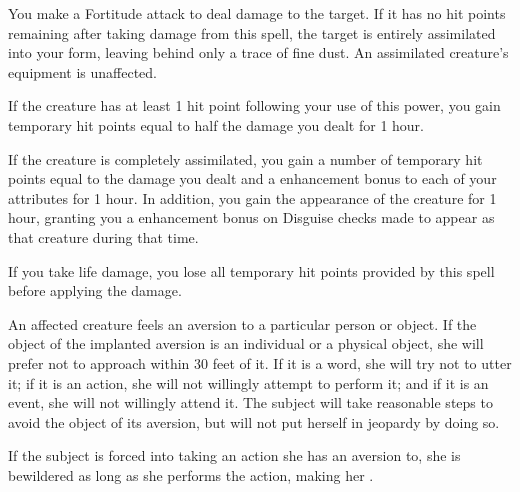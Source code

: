 \spellrng{\rngtouch}
You make a Fortitude attack to deal damage to the target. If it has no hit points remaining after taking damage from this spell, the target is entirely assimilated into your form, leaving behind only a trace of fine dust. An assimilated creature's equipment is unaffected.
\par If the creature has at least 1 hit point following your use of this power, you gain temporary hit points equal to half the damage you dealt for 1 hour.
\par If the creature is completely assimilated, you gain a number of temporary hit points equal to the damage you dealt and a  enhancement bonus to each of your attributes for 1 hour. In addition, you gain the appearance of the creature for 1 hour, granting you a  enhancement bonus on Disguise checks made to appear as that creature during that time.

If you take life damage, you lose all temporary hit points provided by this spell before applying the damage.

\spellrng{\rngmed}
\spelldur{\durext}
\begin{spelleffect}
  An affected creature feels an aversion to a particular person or object. If the object of the implanted aversion is an individual or a physical object, she will prefer not to approach within 30 feet of it. If it is a word, she will try not to utter it; if it is an action, she will not willingly attempt to perform it; and if it is an event, she will not willingly attend it. The subject will take reasonable steps to avoid the object of its aversion, but will not put herself in jeopardy by doing so.
  \par If the subject is forced into taking an action she has an aversion to, she is bewildered as long as she performs the action, making her \vulnerable.
\end{spelleffect}

